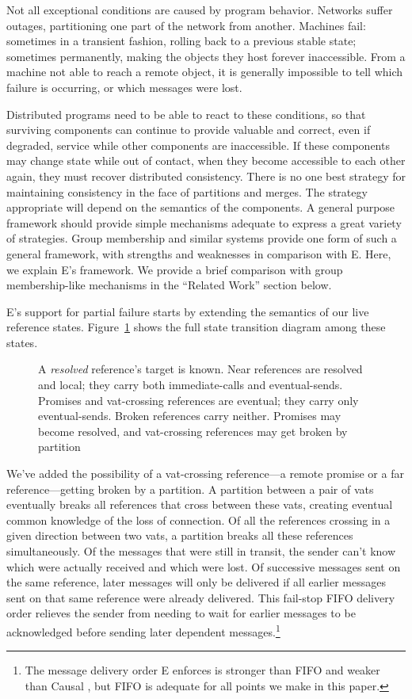 \documentclass{llncs}
\begin{document}
Not all exceptional conditions are caused by program behavior.
Networks suffer outages, partitioning one part of the network from
another. Machines fail: sometimes in a transient fashion, rolling back
to a previous stable state; sometimes permanently, making the objects
they host forever inaccessible. From a machine not able to reach a
remote object, it is generally impossible to tell which failure is
occurring, or which messages were lost.

Distributed programs need to be able to react to these conditions, so
that surviving components can continue to provide valuable and
correct, even if degraded, service while other components are
inaccessible. If these components may change state while out of
contact, when they become accessible to each other again, they must
recover distributed consistency. There is no one best strategy for
maintaining consistency in the face of partitions and merges. The
strategy appropriate will depend on the semantics of the components. A
general purpose framework should provide simple mechanisms adequate to
express a great variety of strategies. Group membership and similar
systems provide one form of such a general framework, with strengths
and weaknesses in comparison with E. Here, we explain E's
framework. We provide a brief comparison with group membership-like
mechanisms in the ``Related Work'' section below.

E's support for partial failure starts by extending the semantics of
our live reference states. Figure~\ref{fig:refstates} shows the full
state transition diagram among these states.

\begin{figure}
\centerline{}
\caption{A \emph{resolved} reference's target is known. Near
  references are resolved and local; they carry both immediate-calls
  and eventual-sends. Promises and vat-crossing references are
  eventual; they carry only eventual-sends. Broken references carry
  neither. Promises may become resolved, and vat-crossing references
  may get broken by partition}
\label{fig:refstates}
\end{figure}

We've added the possibility of a vat-crossing reference---a remote
promise or a far reference---getting broken by a partition. A
partition between a pair of vats eventually breaks all references that
cross between these vats, creating eventual common knowledge of the
loss of connection. Of all the references crossing in a given
direction between two vats, a partition breaks all these references
simultaneously. Of the messages that were still in transit, the sender
can't know which were actually received and which were lost. Of
successive messages sent on the same reference, later messages will
only be delivered if all earlier messages sent on that same reference
were already delivered. This fail-stop FIFO delivery order relieves
the sender from needing to wait for earlier messages to be
acknowledged before sending later dependent messages.\footnote{
%
The message delivery order E enforces is stronger than FIFO and weaker
than Causal \cite{tribble:channels}, but FIFO is adequate for all
points we make in this paper.}
\end{document}
